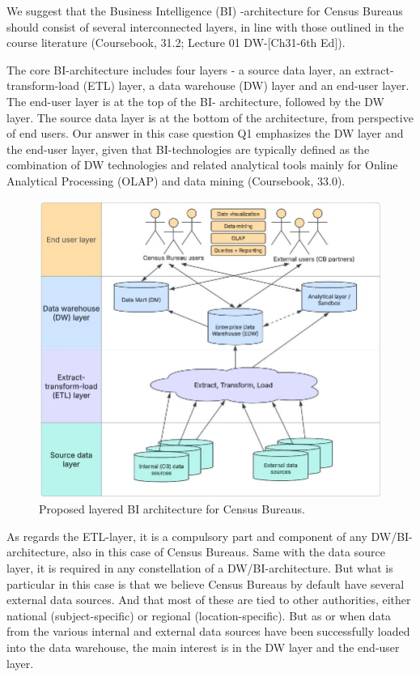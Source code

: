 We suggest that the Business Intelligence (BI) -architecture for Census Bureaus should consist of several interconnected layers, 
in line with those outlined in the course literature (Coursebook, 31.2; Lecture 01 DW-[Ch31-6th Ed]). 

The core BI-architecture includes four layers - a source data layer, an extract-transform-load (ETL) layer, 
a data warehouse (DW) layer and an end-user layer. 
The end-user layer is at the top of the BI- architecture, followed by the DW layer. 
The source data layer is at the bottom of the architecture, from perspective of end users. 
Our answer in this case question Q1 emphasizes the DW layer and the end-user layer, 
given that BI-technologies are typically defined as the combination of DW technologies and 
related analytical tools mainly for Online Analytical Processing (OLAP) and data mining (Coursebook, 33.0).  

\begin{figure}[h] %
  \centering
  \includegraphics[width=1.0\textwidth]{Figures/Q1_BI_architecture.jpg}
  \caption{Proposed layered BI architecture for Census Bureaus.}
  \label{fig:BI_arch}
\end{figure}
\newpage
As regards the ETL-layer, it is a compulsory part and component of any DW/BI-architecture, 
also in this case of Census Bureaus. 
Same with the data source layer, it is required in any constellation of a DW/BI-architecture. 
But what is particular in this case is that we believe Census Bureaus by default have 
several external data sources. 
And that most of these are tied to other authorities, 
either national (subject-specific) or regional (location-specific). 
But as or when data from the various internal and external data sources have been successfully loaded into 
the data warehouse, the main interest is in the DW layer and the end-user layer.  

